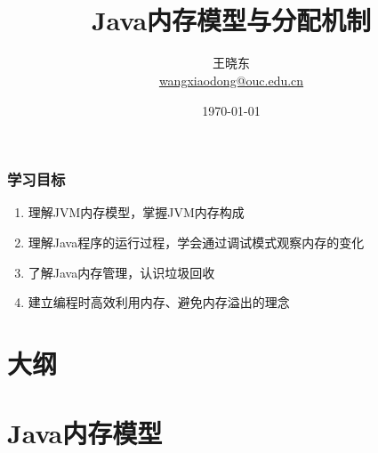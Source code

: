 
\title[JAVA]{\\  
 Java内存模型与分配机制}
\author[王晓东]{王晓东\\
  \href{mailto:wangxiaodong@ouc.edu.cn}{\footnotesize wangxiaodong@ouc.edu.cn}}
\date{\today}


\frame{\titlepage}

\begin{frame}
  \frametitle{学习目标}
  
  \begin{enumerate}
  \item 理解JVM内存模型，掌握JVM内存构成
  \item 理解Java程序的运行过程，学会通过调试模式观察内存的变化
  \item 了解Java内存管理，认识垃圾回收
  \item 建立编程时高效利用内存、避免内存溢出的理念
  \end{enumerate}  
\end{frame}


\section*{大纲}

\section{Java内存模型}

